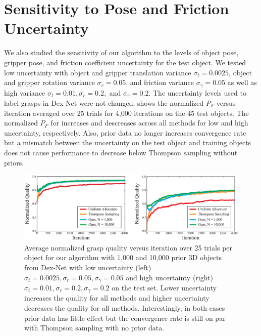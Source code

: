 \section{Sensitivity to Pose and Friction Uncertainty}
We also studied the sensitivity of our algorithm to the levels of object pose, gripper pose, and friction coefficient uncertainty for the test object.
We tested low uncertainty with object and gripper translation variance $\sigma_{t} = 0.0025$, object and gripper rotation variance $\sigma_{r} = 0.05$, and friction variance $\sigma_{\gamma} = 0.05$ as well as high variance $\sigma_{t} = 0.01, \sigma_{r} = 0.2,$ and $\sigma_{\gamma} = 0.2$.
The uncertainty levels used to label grasps in Dex-Net were not changed.
 shows the normalized $P_F$ versus iteration averaged over 25 trials for 4,000 iterations on the 45 test objects.
The normalized $P_F$ for increases and descreases across all methods for low and high uncertainty, respectively.
Also, prior data no longer increases convergence rate but a mismatch between the uncertainty on the test object and training objects does not cause performance to decrease below Thompson sampling without priors.

\begin{figure}[t!]
\centering
\includegraphics[scale=0.23]{figures/illustrations/u_sensitivity.eps}
\caption{Average normalized grasp quality versus iteration over 25 trials per object for our algorithm with 1,000 and 10,000 prior 3D objects from Dex-Net with low uncertainty (left) $\sigma_{t} = 0.0025, \sigma_{r} = 0.05, \sigma_{\gamma} = 0.05$ and high uncertainty (right) $\sigma_{t} = 0.01, \sigma_{r} = 0.2, \sigma_{\gamma} = 0.2$ on the test set. Lower uncertainty increases the quality for all methods and higher uncertainty decreases the quality for all methods. Interestingly, in both cases prior data has little effect but the convergence rate is still on par with Thompson sampling with no prior data.}
\vspace*{-10pt}
\end{figure}
